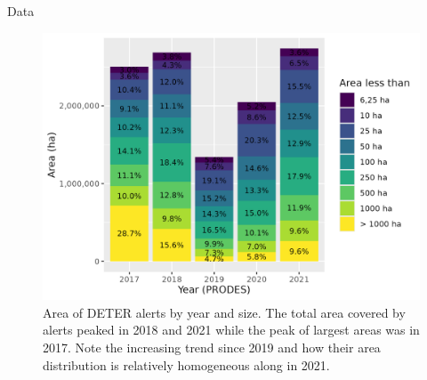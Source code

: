 \documentclass[20pt]{beamer}
\begin{document}
\begin{frame}[fragile,t]
\begin{columns}[t]
\begin{column}{0.33\linewidth}
\begin{block}{Data}
\begin{figure}[h] 
    \begin{center}
    \includegraphics[width=\linewidth]{./figures/deter_warnings_area_size.png}
        \caption{Area of DETER alerts by year and size.
        The total area covered by alerts peaked in 2018 and 2021 while the peak of largest areas was in 2017.
        Note the increasing trend since 2019 and how their area distribution is relatively homogeneous along in 2021.}
    \label{fig:deter_warnings_area_size}
    \end{center}
\end{figure}


    \end{block}


\end{column}
\end{columns}
\end{frame}
\end{document}

